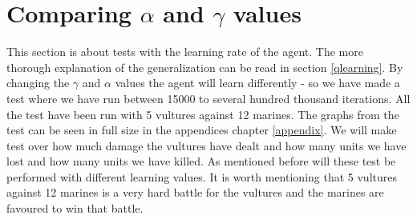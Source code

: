 \section{Comparing $\alpha$ and $\gamma$ values}
This section is about tests with the learning rate of the agent. The more thorough explanation of the generalization can be read in section \ref{qlearning}.
By changing the $\gamma$ and $\alpha$ values the agent will learn differently - so we have made a test where we have run between 15000 to several hundred thousand iterations. All the test have been run with 5 vultures against 12 marines. The graphs from the test can be seen in full size in the appendices chapter \ref{appendix}. We will make test over how much damage the vultures have dealt and how many units we have lost and how many units we have killed. As mentioned before will these test be performed with different learning values. It is worth mentioning that 5 vultures against 12 marines is a very hard battle for the vultures and the marines are favoured to win that battle.


